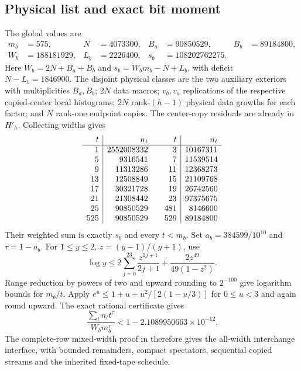 \subsection{Physical list and exact bit moment}
The global values are
\[
\begin{aligned}
 m_b&=575,&N&=4073300,&B_a&=90850529,&B_b&=89184800,\\
 W_b&=188181929,&L_b&=2226400,&s_b&=108202762275.
\end{aligned}
\]
Here $W_b=2N+B_a+B_b$ and $s_b=W_bm_b-N+L_b$, with deficit
$N-L_b=1846900$. The disjoint physical classes are the two auxiliary
exteriors with multiplicities $B_a,B_b$; $2N$ data macros; $v_b,v_a$
replications of the respective copied-center local histograms; $2N$
rank-$(h-1)$ physical data growths for each factor; and $N$ rank-one
endpoint copies. The center-copy residuals are already in $H'_h$.
Collecting widths gives
\[
\begin{array}{r|r@{\qquad}r|r}
t&n_t&t&n_t\\\hline
1&2552008332&3&10167311\\
5&9316541&7&11539514\\
9&11313286&11&12368273\\
13&12508849&15&21109768\\
17&30321728&19&26742560\\
21&21308442&23&97375675\\
25&90850529&481&8146600\\
525&90850529&529&89184800
\end{array}
\]
Their weighted sum is exactly $s_b$ and every $t<m_b$.
Set $a_b=384599/10^{10}$ and $\tau=1-a_b$.
For $1\le y\le2$, $z=(y-1)/(y+1)$, use
\[
 \log y\le2\sum_{j=0}^{23}\frac{z^{2j+1}}{2j+1}
             +\frac{2z^{49}}{49(1-z^2)}.
\]
Range reduction by powers of two and upward rounding to $2^{-100}$
give logarithm bounds for $m_b/t$. Apply
$e^u\le1+u+u^2/[2(1-u/3)]$ for $0\le u<3$ and again round upward.
The exact rational certificate gives
\[
 \frac{\sum_tn_tt^\tau}{W_bm_b^\tau}
 <1-2.1089950663\times10^{-12}.
\]
The complete-row mixed-width proof in 
therefore gives the all-width interchange interface, with bounded
remainders, compact spectators, sequential copied streams and the
inherited fixed-tape schedule.

